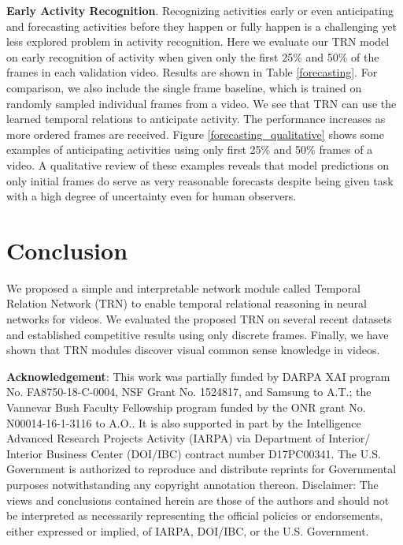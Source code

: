 \documentclass[runningheads]{llncs}
\begin{document}
\textbf{Early Activity Recognition}. Recognizing activities early or even anticipating and forecasting activities before they happen or fully happen is a challenging yet less explored problem in activity recognition. Here we evaluate our TRN model on early recognition of activity when given only the first 25\% and 50\% of the frames in each validation video. Results are shown in Table \ref{forecasting}. For comparison, we also include the single frame baseline, which is trained on randomly sampled individual frames from a video. We see that TRN can use the learned temporal relations to anticipate activity. The performance increases as more ordered frames are received. Figure \ref{forecasting_qualitative} shows some examples of anticipating activities using only first 25\% and 50\% frames of a video. A qualitative review of these examples reveals that model predictions on only initial frames do serve as very reasonable forecasts despite being given task with a high degree of uncertainty even for human observers. 

\section{Conclusion}
We proposed a simple and interpretable network module called Temporal Relation Network (TRN) to enable temporal relational reasoning in neural networks for videos. We evaluated the proposed TRN on several recent datasets and established competitive results using only discrete frames. Finally, we have shown that TRN modules discover visual common sense knowledge in videos.

\tiny
\textbf{Acknowledgement}: This work was partially funded by DARPA XAI program No. FA8750-18-C-0004, NSF Grant No. 1524817, and Samsung to A.T.; the Vannevar Bush Faculty Fellowship program funded by the ONR grant No. N00014-16-1-3116 to A.O.. It is also supported in part by the Intelligence Advanced Research Projects Activity (IARPA) via Department of Interior/ Interior Business Center (DOI/IBC) contract number D17PC00341. The U.S. Government is authorized to reproduce and distribute reprints for Governmental purposes notwithstanding any copyright annotation thereon. Disclaimer: The views and conclusions contained herein are those of the authors and should not be interpreted as necessarily representing the official policies or endorsements, either expressed or implied, of IARPA, DOI/IBC, or the U.S. Government.
\clearpage



\end{document}
